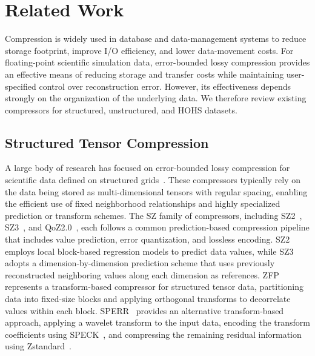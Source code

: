 \section{Related Work}\label{sec:related work}

Compression is widely used in database and data-management systems to reduce storage footprint, improve I/O efficiency, and lower data-movement costs. For floating-point scientific simulation data, error-bounded lossy compression provides an effective means of reducing storage and transfer costs while maintaining user-specified control over reconstruction error. However, its effectiveness depends strongly on the organization of the underlying data. We therefore review existing compressors for structured, unstructured, and HOHS datasets.

\subsection{Structured Tensor Compression}

A large body of research has focused on error-bounded lossy compression for scientific data defined on structured grids~\cite{lindstrom2014fixed,di2016fast,tao2017significantly,liang2018error,zhao2021optimizing,liang2022sz3,gong2023mgard,huang2023cuszp}. 
These compressors typically rely on the data being stored as multi-dimensional tensors with regular spacing, enabling the efficient use of fixed neighborhood relationships and highly specialized prediction or transform schemes.
The SZ family of compressors, including SZ2~\cite{tao2017significantly}, SZ3~\cite{liang2022sz3,zhao2021optimizing}, and QoZ2.0~\cite{liu2024high}, each follows a common prediction-based compression pipeline that includes value prediction, error quantization, and lossless encoding. 
SZ2 employs local block-based regression models to predict data values, while SZ3 adopts a dimension-by-dimension prediction scheme that uses previously reconstructed neighboring values along each dimension as references. 
ZFP~\cite{lindstrom2014fixed} represents a transform-based compressor for structured tensor data, partitioning data into fixed-size blocks and applying orthogonal transforms to decorrelate values within each block. 
SPERR~\cite{li2023lossy} provides an alternative transform-based approach, applying a wavelet transform to the input data, encoding the transform coefficients using SPECK~\cite{Pearlman2004speck}, and compressing the remaining residual information using Zstandard~\cite{ycollet2021zstd}.

